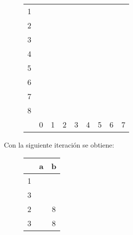 \documentclass[11pt,a4paper]{article}
\begin{document}
		\begin{figure}[H]
			\centering
			\begin{tabular}{*{9}{c|}}
																							\cline{2-2}
				1 & \color{blue}{X}															\\ \cline{2-3}
				2 & \color{blue}{X} &														\\ \cline{2-4}
				3 & \color{blue}{X} & &											\\ \cline{2-5}
				4 & \color{red}{X} & \color{blue}{X} & \color{blue}{X} & \color{blue}{X}	\\ \cline{2-6}
				5 & \color{red}{X} & \color{blue}{X} & \color{blue}{X} & \color{blue}{X} & \color{red}{X} \\ \cline{2-7}
				6 & \color{red}{X} & \color{blue}{X} & \color{blue}{X} & \color{blue}{X} &
				  & \color{red}{X} \\ \cline{2-8}
				7 & \color{red}{X} & \color{blue}{X} & \color{blue}{X} & \color{blue}{X} & \color{red}{X} & 
				  & \color{red}{X} \\ \cline{2-9}
				8 & \color{blue}{X} & \color{red}{X} & \color{red}{X} & \color{red}{X} & \color{blue}{X} & \color{blue}{X} &
					\color{blue}{X} & \color{blue}{X} \\ \cline{2-9}
				\multicolumn{0}{c}{} & \multicolumn{1}{c}{0} & \multicolumn{1}{c}{1} & \multicolumn{1}{c}{2}
				& \multicolumn{1}{c}{3} & \multicolumn{1}{c}{4} & \multicolumn{1}{c}{5} & \multicolumn{1}{c}{6}
				& \multicolumn{1}{c}{7}
			\end{tabular}
		\end{figure}
		
		Con la siguiente iteración se obtiene:
		
		\begin{figure}[H]
			\centering
			\begin{tabular}{c|cc}
				& a & b		\\ \hline
				1 & \color{red}{1} & \color{red}{3}	\\
				3 & \color{red}{4} & \color{red}{8}	\\ \hline
				2 & \color{red}{0} & 8 \\
				3 & \color{red}{4} & 8 \\ \hline
			\end{tabular}
		\end{figure}
		
\end{document}
